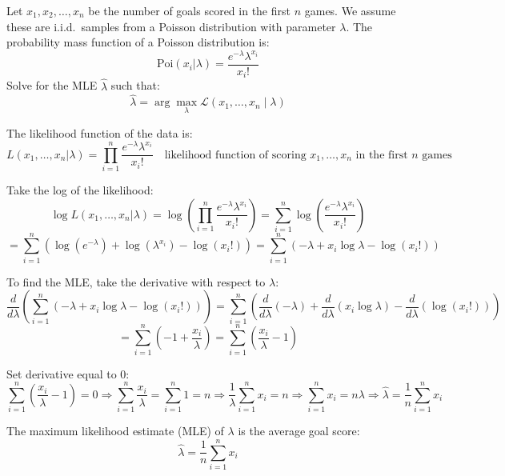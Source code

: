 \documentclass{article}
\begin{document}
\begin{aprob}
\begin{tcolorbox}[colback=lightgray!10!white, colframe=black, title=A2.a]
            Let $x_1, x_2, \dots, x_n$ be the number of goals scored in the first $n$ games. We assume these are i.i.d.\ samples from a Poisson distribution with parameter $\lambda$. The probability mass function of a Poisson distribution is:
            \[
            \text{Poi}(x_i | \lambda) = \frac{e^{-\lambda} \lambda^{x_i}}{x_i!}
            \]
            Solve for the MLE $\hat{\lambda}$ such that:
            \[
\hat{\lambda} = \arg\max_{\lambda} \mathcal{L}(x_1, \dots, x_n \mid \lambda)
\]

            
            The likelihood function of the data is:
            \[
            L(x_1, \dots, x_n | \lambda) = \prod_{i=1}^{n} \frac{e^{-\lambda} \lambda^{x_i}}{x_i!}
            \quad \text{likelihood function of scoring } x_1, \dots, x_n \text{ in the first } n \text{ games}
            \]
            
            Take the log of the likelihood:
            \[
            \log L(x_1, \dots, x_n | \lambda) = \log \left( \prod_{i=1}^{n} \frac{e^{-\lambda} \lambda^{x_i}}{x_i!} \right)
            = \sum_{i=1}^{n} \log \left( \frac{e^{-\lambda} \lambda^{x_i}}{x_i!} \right)
            \]
            \[
            = \sum_{i=1}^{n} \left( \log(e^{-\lambda}) + \log(\lambda^{x_i}) - \log(x_i!) \right)
            = \sum_{i=1}^{n} \left( -\lambda + x_i \log \lambda - \log(x_i!) \right)
            \]
            
            To find the MLE, take the derivative with respect to $\lambda$:
            \[
            \frac{d}{d\lambda} \left( \sum_{i=1}^{n} \left( -\lambda + x_i \log \lambda - \log(x_i!) \right) \right)
            = \sum_{i=1}^{n} \left( \frac{d}{d\lambda} (-\lambda) + \frac{d}{d\lambda}(x_i \log \lambda) - \frac{d}{d\lambda}(\log(x_i!)) \right)
            \]
            \[
            = \sum_{i=1}^{n} \left( -1 + \frac{x_i}{\lambda} \right)
            = \sum_{i=1}^{n} \left( \frac{x_i}{\lambda} - 1 \right)
            \]
            
            Set derivative equal to 0:
            \[
            \sum_{i=1}^{n} \left( \frac{x_i}{\lambda} - 1 \right) = 0
            \Rightarrow \sum_{i=1}^{n} \frac{x_i}{\lambda} = \sum_{i=1}^{n} 1 = n
            \Rightarrow \frac{1}{\lambda} \sum_{i=1}^{n} x_i = n
            \Rightarrow \sum_{i=1}^{n} x_i = n\lambda
            \Rightarrow \hat{\lambda} = \frac{1}{n} \sum_{i=1}^{n} x_i
            \]
            
            The maximum likelihood estimate (MLE) of $\lambda$ is the average goal score:
            \[
            \boxed{\hat{\lambda} = \frac{1}{n} \sum_{i=1}^{n} x_i}
            \]
            \end{tcolorbox}
            

\end{aprob}
\end{document}
